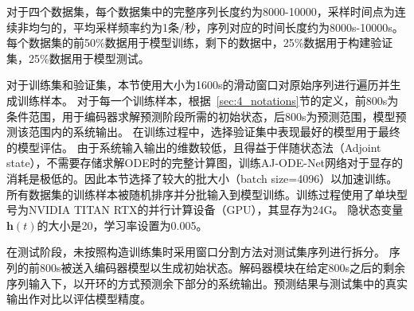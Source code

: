 对于四个数据集，每个数据集中的完整序列长度约为8000-10000，采样时间点为连续非均匀的，平均采样频率约为1条/秒，序列对应的时间长度约为8000s-10000s。
每个数据集的前50\%数据用于模型训练，剩下的数据中，25\%数据用于构建验证集，25\%数据用于模型测试。

对于训练集和验证集，本节使用大小为1600s的滑动窗口对原始序列进行遍历并生成训练样本。
对于每一个训练样本，根据~\ref{sec:4_notations}节的定义，前800s为条件范围，用于编码器求解预测阶段所需的初始状态，后800s为预测范围，模型预测该范围内的系统输出。
在训练过程中，选择验证集中表现最好的模型用于最终的模型评估。
由于系统输入输出的维数较低，且得益于伴随状态法（Adjoint state），不需要存储求解ODE时的完整计算图，训练AJ-ODE-Net网络对于显存的消耗是极低的。因此本节选择了较大的批大小（batch size=4096）以加速训练。
所有数据集的训练样本被随机排序并分批输入到模型训练。训练过程使用了单块型号为NVIDIA TITAN RTX的并行计算设备（GPU），其显存为24G。
隐状态变量$\boldsymbol h(t)$的大小是20，学习率设置为0.005。

在测试阶段，未按照构造训练集时采用窗口分割方法对测试集序列进行拆分。
序列的前800s被送入编码器模型以生成初始状态。解码器模块在给定800s之后的剩余序列输入下，以开环的方式预测余下部分的系统输出。预测结果与测试集中的真实输出作对比以评估模型精度。




